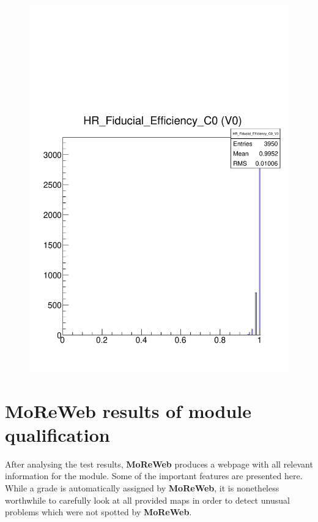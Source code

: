 \documentclass[a4paper,12pt,twoside]{article}
\begin{document}
\begin{figure} [h!]
\begin{minipage}[t]{.48\textwidth}
  \includegraphics[width=\textwidth]{./Figures/Efficiency_Fiducial.pdf}
  \label{Efficiency-Fiducial}
\end{minipage}
\end{figure}


\section{MoReWeb results of module qualification}

After analysing the test results, \textbf{MoReWeb} produces a webpage with all relevant information for the module. Some of the important features are presented here. While a grade is automatically assigned by \textbf{MoReWeb}, it is nonetheless worthwhile to carefully look at all provided maps in order to detect unusual problems which were not spotted by \textbf{MoReWeb}.
\end{document}

